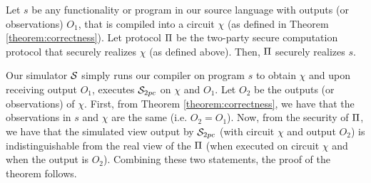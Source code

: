 \begin{theorem}[Security]\label{theorem:security}
Let $s$ be any functionality or program in our source language with outputs (or observations) $O_1$, that is compiled into a circuit $\chi$ (as defined in Theorem \ref{theorem:correctness}). Let protocol $\Pi$ be the two-party secure computation protocol that securely realizes $\chi$ (as defined above). Then, $\Pi$ securely realizes $s$.  
\end{theorem}

 Our simulator $\mathcal{S}$ simply runs our compiler on program $s$ to obtain $\chi$ and upon receiving output $O_1$, executes $\simu_{\tiny{2pc}}$ on $\chi$ and $O_1$. Let $O_2$ be the outputs (or observations) of $\chi$. First, from Theorem \ref{theorem:correctness}, we have that the observations in $s$ and $\chi$ are the same (i.e. $O_2 = O_1$). Now, from the security of $\Pi$, we have that the simulated view output by $\simu_{\tiny{2pc}}$ (with circuit $\chi$ and output $O_2$) is indistinguishable from the real view of the $\Pi$ (when executed on circuit $\chi$ and when the output is $O_2$). Combining these two statements, the proof of the theorem follows. 

